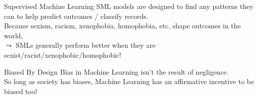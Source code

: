 \documentclass[11pt]{beamer}
\begin{document}
\begin{frame}[c]{Supervised Machine Learning}
  SML models are designed to find any patterns they can to help predict outcomes / classify records. \\
  \vspace{0.2cm}
  \pause Because sexism, racism, xenophobia, homophobia, etc. shape outcomes in the world, \\
  \vspace{0.2cm}
  \pause $\leadsto$ SMLs generally \alert{perform better} when they are sexist/racist/xenophobic/homophobic!
\end{frame}


\begin{frame}[c]{Biased By Design}
  Bias in Machine Learning isn't the result of negligence. \\
  \vspace{0.3cm}
  \pause \alert{So long as society has biases}, Machine Learning has an \alert{affirmative incentive} to be biased too!
\end{frame}
\end{document}

